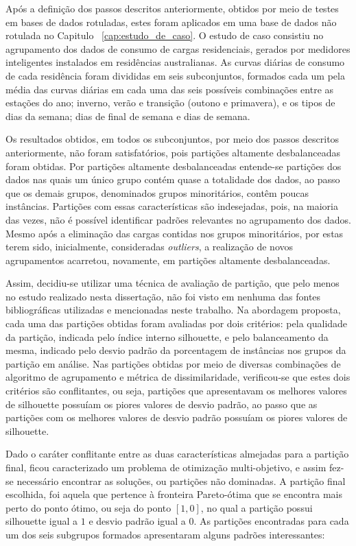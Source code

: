 Após a definição dos passos descritos anteriormente, obtidos por meio de testes em bases de dados rotuladas, estes foram aplicados em uma base de dados não rotulada no Capitulo ~\ref{cap:estudo_de_caso}. O estudo de caso consistiu no agrupamento dos dados de consumo de cargas residenciais, gerados por medidores inteligentes instalados em residências australianas. As curvas diárias de consumo de cada residência foram divididas em seis subconjuntos, formados cada um pela média das curvas diárias em cada uma das seis possíveis combinações entre as estações do ano; inverno, verão e transição (outono e primavera), e os tipos de dias da semana; dias de final de semana e dias de semana.

Os resultados obtidos, em todos os subconjuntos, por meio dos passos descritos anteriormente, não foram satisfatórios, pois partições altamente desbalanceadas foram obtidas. Por partições altamente desbalanceadas entende-se partições dos dados nas quais um único grupo contém quase a totalidade dos dados, ao passo que os demais grupos, denominados grupos minoritários, contêm poucas instâncias. Partições com essas características são indesejadas, pois, na maioria das vezes, não é possível identificar padrões relevantes no agrupamento dos dados. Mesmo após a eliminação das cargas contidas nos grupos minoritários, por estas terem sido, inicialmente, consideradas \emph{outliers}, a realização de novos agrupamentos acarretou, novamente, em partições altamente desbalanceadas.

Assim, decidiu-se utilizar uma técnica de avaliação de partição, que pelo menos no estudo realizado nesta dissertação, não foi visto em nenhuma das fontes bibliográficas utilizadas e mencionadas neste trabalho. Na abordagem proposta, cada uma das partições obtidas foram avaliadas por dois critérios: pela qualidade da partição, indicada pelo índice interno silhouette, e pelo balanceamento da mesma, indicado pelo desvio padrão da porcentagem de instâncias nos grupos da partição em análise. Nas partições obtidas por meio de diversas combinações de algoritmo de agrupamento e métrica de dissimilaridade, verificou-se que estes dois critérios são conflitantes, ou seja, partições que apresentavam os melhores valores de silhouette possuíam os piores valores de desvio padrão, ao passo que as partições com os melhores valores de desvio padrão possuíam os piores valores de silhouette.

Dado o caráter conflitante entre as duas características almejadas para a partição final, ficou caracterizado um problema de otimização multi-objetivo, e assim fez-se necessário encontrar as soluções, ou partições não dominadas. A partição final escolhida, foi aquela que pertence à fronteira Pareto-ótima que se encontra mais perto do ponto ótimo, ou seja do ponto $[1,0]$, no qual a partição possui silhouette igual a $1$ e desvio padrão igual a $0$. As partições encontradas para cada um dos seis subgrupos formados apresentaram alguns padrões interessantes:

